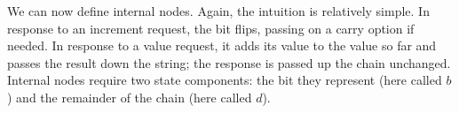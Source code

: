 \documentclass[orivec,envcountsame]{llncs}
\newcommand{\mkwd}[1]{\mathsf{#1}}
\newcommand{\link}[2]{#1 \leftrightarrow #2}
\newcommand{\rec}[1]{\mkwd{rec}\:#1}
\newcommand{\clabel}[1]{\mathrm{#1}}
\newcommand{\sel}[2]{#1[\clabel{#2}]}
\newcommand{\lrkwd}{\mkwd{fix}}
\begin{document}
%
%
We can now define internal nodes.  Again, the intuition is relatively simple.  In response to an
increment request, the bit flips, passing on a carry option if needed.  In response to a value
request, it adds its value to the value so far and passes the result down the string; the response
is passed up the chain unchanged.  Internal nodes require two state components: the bit they
represent (here called $b$) and the remainder of the chain (here called $d$).
%
%
\newcommand{\gvifthen}[3]{\mkwd{if}\:#1\:\mkwd{then}\:#2\:\mkwd{else}\:#3}
\end{document}
